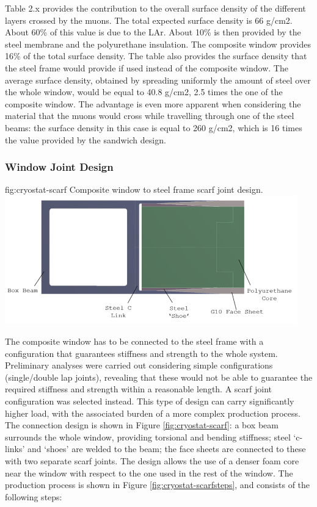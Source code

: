 Table 2.x provides the contribution to the overall surface density of the different layers crossed by the muons. The total expected surface density is 66 g/cm2. About 60\% of this value is due to the LAr. About 10\% is then provided by the steel membrane and the polyurethane insulation. The composite window provides 16\% of the total surface density. The table also provides the surface density that the steel frame would provide if used instead of the composite window. The average surface density, obtained by spreading uniformly the amount of steel over the whole window, would be equal to 40.8 g/cm2, 2.5 times the one of the composite window. The advantage is even more apparent when considering the material that the muons would cross while travelling through one of the steel beams: the surface density in this case is equal to 260 g/cm2, which is 16 times the value provided by the sandwich design.

\subsubsection{Window Joint Design}
\label{sec:cryost-des-window}

\begin{dunefigure}{fig:cryostat-scarf}
{Composite window to steel frame scarf joint design.}
\includegraphics[width=0.95\textwidth]{graphics/cryostat/cryostat-scarf.png}
\end{dunefigure}

The composite window has to be connected to the steel frame with a configuration that guarantees stiffness and strength to the whole system. Preliminary analyses were carried out considering simple configurations (single/double lap joints), revealing that these would not be able to guarantee the required stiffness and strength within a reasonable length. A scarf joint configuration was selected instead. This type of design can carry significantly higher load, with the associated burden of a more complex production process. The connection design is shown in Figure \ref{fig:cryostat-scarf}: a box beam surrounds the whole window, providing torsional and bending stiffness; steel ‘c-links’ and ‘shoes’ are welded to the beam; the face sheets are connected to these with two separate scarf joints. The design allows the use of a denser foam core near the window with respect to the one used in the rest of the window. The production process is shown in Figure \ref{fig:cryostat-scarfsteps}, and consists of the following steps:

